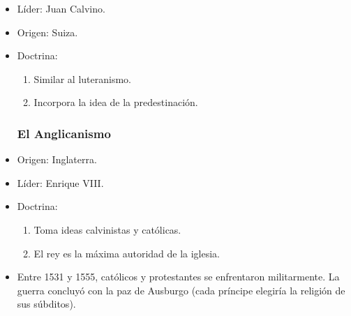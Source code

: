 \begin{itemize}
\item Líder: Juan Calvino.
\item Origen: Suiza.

\item Doctrina:
\begin{enumerate}
	\item Similar al luteranismo.
	\item Incorpora la idea de la predestinación.
\end{enumerate}

\subsubsection{El Anglicanismo}

\item Origen: Inglaterra.
\item Líder: Enrique VIII.

\item Doctrina:
\begin{enumerate}
	\item Toma ideas calvinistas y católicas.
	\item El rey es la máxima autoridad de la iglesia.
\end{enumerate}

\item Entre 1531 y 1555, católicos y protestantes se enfrentaron militarmente.
La guerra concluyó con la paz de Ausburgo (cada príncipe elegiría la religión de sus súbditos).

\end{itemize}